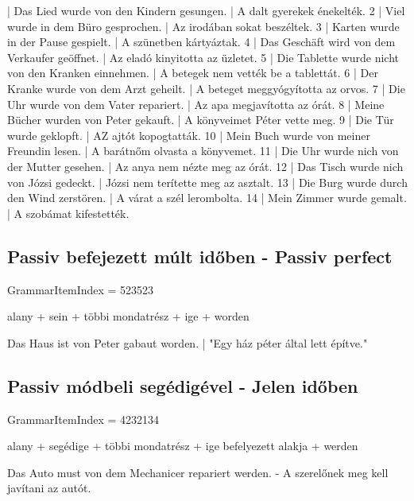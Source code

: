 \documentclass{article}
\newenvironment{desc}{\verbatim}{\endverbatim}
\newenvironment{exmp}{\verbatim}{\endverbatim}
\begin{document}
\begin{exmp}
1 | Das Lied wurde von den Kindern gesungen. | A dalt gyerekek énekelték.
2 | Viel wurde in dem Büro gesprochen. | Az irodában sokat beszéltek.
3 | Karten wurde in der Pause gespielt. | A szünetben kártyáztak.
4 | Das Geschäft wird von dem Verkaufer geöffnet. | Az eladó kinyitotta az üzletet.
5 | Die Tablette wurde nicht von den Kranken einnehmen. | A betegek nem vették be a tablettát.
6 | Der Kranke wurde von dem Arzt geheilt. | A beteget meggyógyította az orvos.
7 | Die Uhr wurde von dem Vater repariert. | Az apa megjavította az órát.
8 | Meine Bücher wurden von Peter gekauft. | A könyveimet Péter vette meg.
9 | Die Tür wurde geklopft. | AZ ajtót kopogtatták.
10 | Mein Buch wurde von meiner Freundin lesen. | A barátnőm olvasta a könyvemet.
11 | Die Uhr wurde nich von der Mutter gesehen. | Az anya nem nézte meg az órát.
12 | Das Tisch wurde nich von Józsi gedeckt. | Józsi nem terítette meg az asztalt.
13 | Die Burg wurde durch den Wind zerstören. | A várat a szél lerombolta.
14 | Mein Zimmer wurde gemalt. | A szobámat kifestették.
\end{exmp}

\subsection{Passiv befejezett múlt időben - Passiv perfect}

GrammarItemIndex = 523523

\begin{desc}
alany + sein + többi mondatrész + ige + worden

Das Haus ist von Peter gabaut worden. | "Egy ház péter által lett építve."
\end{desc}

\subsection{Passiv módbeli segédigével - Jelen időben}

GrammarItemIndex = 4232134

\begin{desc}
alany + segédige + többi mondatrész + ige befelyezett alakja + werden

Das Auto must von dem Mechanicer repariert werden. - A szerelőnek meg kell javítani az autót.
\end{desc}
\end{document}
